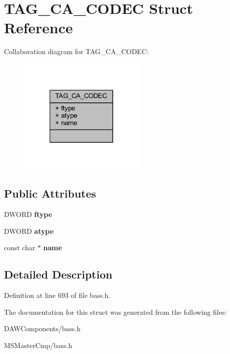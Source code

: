 \hypertarget{struct_t_a_g___c_a___c_o_d_e_c}{\section{T\-A\-G\-\_\-\-C\-A\-\_\-\-C\-O\-D\-E\-C Struct Reference}
\label{struct_t_a_g___c_a___c_o_d_e_c}
}


Collaboration diagram for T\-A\-G\-\_\-\-C\-A\-\_\-\-C\-O\-D\-E\-C\-:\nopagebreak
\begin{figure}[H]
\begin{center}
\leavevmode
\includegraphics[width=174pt]{struct_t_a_g___c_a___c_o_d_e_c__coll__graph}
\end{center}
\end{figure}
\subsection*{Public Attributes}
\begin{DoxyCompactItemize}
\item 
\hypertarget{struct_t_a_g___c_a___c_o_d_e_c_af43a0d3c8d295bc3a37ae9245a47619b_af43a0d3c8d295bc3a37ae9245a47619b}{D\-W\-O\-R\-D {\bfseries ftype}}\label{struct_t_a_g___c_a___c_o_d_e_c_af43a0d3c8d295bc3a37ae9245a47619b_af43a0d3c8d295bc3a37ae9245a47619b}

\item 
\hypertarget{struct_t_a_g___c_a___c_o_d_e_c_a9f3c5b7726d72f1174290dfca6793bc1_a9f3c5b7726d72f1174290dfca6793bc1}{D\-W\-O\-R\-D {\bfseries atype}}\label{struct_t_a_g___c_a___c_o_d_e_c_a9f3c5b7726d72f1174290dfca6793bc1_a9f3c5b7726d72f1174290dfca6793bc1}

\item 
\hypertarget{struct_t_a_g___c_a___c_o_d_e_c_a75fc5f7cffd6b44cd32563d23b4bfa5e_a75fc5f7cffd6b44cd32563d23b4bfa5e}{const char $\ast$ {\bfseries name}}\label{struct_t_a_g___c_a___c_o_d_e_c_a75fc5f7cffd6b44cd32563d23b4bfa5e_a75fc5f7cffd6b44cd32563d23b4bfa5e}

\end{DoxyCompactItemize}


\subsection{Detailed Description}


Definition at line 693 of file bass.\-h.



The documentation for this struct was generated from the following files\-:\begin{DoxyCompactItemize}
\item 
D\-A\-W\-Components/bass.\-h\item 
M\-S\-Master\-Cmp/bass.\-h\end{DoxyCompactItemize}
